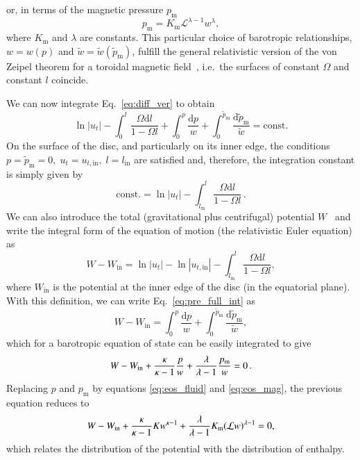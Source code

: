 \documentclass[]{aa}
\begin{document}
or, in terms of the magnetic pressure $p_{\mathrm{m}}$
\begin{equation}\label{eq:eos_mag}
p_{\mathrm{m}} = K_{\mathrm{m}} \mathcal{L}^{\lambda
-1} w^{\lambda
},
\end{equation}
where $K_{\mathrm{m}}$ and $\lambda
$ are constants.
This particular choice of barotropic relationships, $w = w(p)$ and $\tilde{w} = \tilde{w}(\tilde{p}_{\mathrm{m}})$, fulfill the general relativistic version of the von Zeipel theorem for a toroidal magnetic field~\citep{vonZeipel:1924, Zanotti:2015}, i.e.~the surfaces of constant $\Omega$ and constant $l$ coincide.

We can now integrate Eq.~\eqref{eq:diff_ver} to obtain
\begin{equation}\label{eq:pre_full_int}
\ln |u_t| - \int^l_0 \frac{\Omega \mathrm{d}l}{1 - \Omega l} + \int^p_0 \frac{\mathrm{d}p}{w} + \int_0^{\tilde{p}_{\mathrm{m}}} \frac{\mathrm{d}\tilde{p}_{\mathrm{m}}}{\tilde{w}} = \mathrm{const}.
\end{equation}
On the surface of the disc, and particularly on its inner edge, the conditions
$p = \tilde{p}_{\mathrm{m}} = 0, \; u_t = u_{t, \mathrm{in}}, \; l = l_{\mathrm{in}}$
are satisfied and, therefore, the integration constant is simply given by
\begin{equation}
\mathrm{const.} = \ln |u_t| - \int^l_{l_\mathrm{in}} \frac{\Omega \mathrm{d}l}{1 - \Omega l}\,.
\end{equation}
We can also introduce the total (gravitational plus centrifugal) potential $W$~\citep{Abramowicz:1978} and write the integral form of the equation of motion (the relativistic Euler equation) as
\begin{equation}\label{eq:potential}
W - W_{\mathrm{in}} = \ln|u_t| - \ln|u_{t,\mathrm{in}}| - \int^{l}_{l_{\mathrm{in}}} \frac{\Omega \mathrm{d}l}{1 - \Omega l},
\end{equation}
where $W_{\mathrm{in}}$ is the potential at the inner edge of the disc (in the equatorial plane). With this definition, we can write Eq.~\eqref{eq:pre_full_int} as
\begin{equation}\label{eq:full_int}
W - W_{\mathrm{in}} = \int^p_0 \frac{\mathrm{d}p}{w} + \int_0^{\tilde{p}_{\mathrm{m}}} \frac{\mathrm{d}\tilde{p}_{\mathrm{m}}}{\tilde{w}},
\end{equation}
which for a barotropic equation of state can be easily integrated to give
\begin{equation}\label{eq:pre_enthalpy_eq}
W - W_{\rm{in}} + \frac{\kappa}{\kappa - 1}\frac{p}{w} + \frac{\lambda
}{\lambda
 - 1}\frac{p_{\mathrm{m}}}{w} = 0\,.
\end{equation}
Replacing $p$ and $p_{\mathrm{m}}$ by equations \eqref{eq:eos_fluid} and \eqref{eq:eos_mag}, the previous equation reduces to
\begin{equation}\label{eq:enthalpy_eq}
W - W_{\rm{in}} + \frac{\kappa}{\kappa - 1} K w^{\kappa - 1} + \frac{\lambda
}{\lambda
 - 1}K_{\mathrm{m}}(\mathcal{L} w)^{\lambda
 - 1} = 0,
\end{equation}
which relates the distribution of the potential with the distribution of enthalpy.
\end{document}
